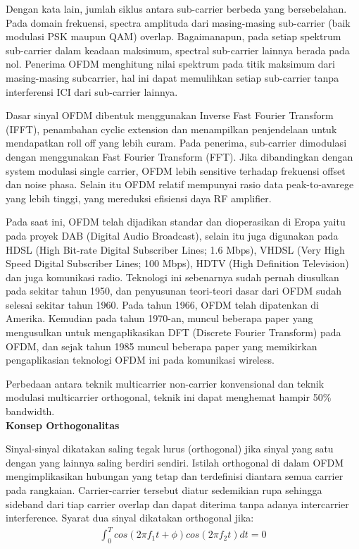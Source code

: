 \documentclass{article}
\begin{document}
Dengan kata lain, jumlah siklus antara sub-carrier berbeda yang bersebelahan. Pada domain frekuensi, spectra amplituda dari masing-masing sub-carrier (baik modulasi PSK maupun QAM) overlap. Bagaimanapun, pada setiap spektrum sub-carrier dalam keadaan maksimum, spectral sub-carrier lainnya berada pada nol. Penerima OFDM menghitung nilai spektrum pada titik maksimum dari masing-masing subcarrier, hal ini dapat memulihkan setiap sub-carrier tanpa interferensi ICI dari sub-carrier lainnya.

Dasar sinyal OFDM dibentuk menggunakan Inverse Fast Fourier Transform (IFFT), penambahan cyclic extension dan menampilkan penjendelaan untuk mendapatkan roll off yang lebih curam. Pada penerima, sub-carrier dimodulasi dengan menggunakan Fast Fourier Transform (FFT). Jika dibandingkan dengan system modulasi single carrier, OFDM lebih sensitive terhadap frekuensi offset dan noise phasa. Selain itu OFDM relatif mempunyai rasio data peak-to-avarege yang lebih tinggi, yang mereduksi efisiensi daya RF amplifier.

Pada saat ini, OFDM telah dijadikan standar dan dioperasikan di Eropa yaitu pada proyek DAB (Digital Audio Broadcast), selain itu juga digunakan pada HDSL (High Bit-rate Digital Subscriber Lines; 1.6 Mbps), VHDSL (Very High
Speed Digital Subscriber Lines; 100 Mbps), HDTV (High Definition Television) dan juga komunikasi radio. Teknologi ini sebenarnya sudah pernah diusulkan pada sekitar tahun 1950, dan penyusunan teori-teori dasar dari OFDM sudah
selesai sekitar tahun 1960. Pada tahun 1966, OFDM telah dipatenkan di Amerika. Kemudian pada tahun 1970-an, muncul beberapa paper yang mengusulkan untuk mengaplikasikan DFT (Discrete Fourier Transform) pada OFDM, dan sejak tahun 1985 muncul beberapa paper yang memikirkan pengaplikasian teknologi OFDM ini pada komunikasi wireless.

Perbedaan antara teknik multicarrier non-carrier konvensional dan teknik modulasi multicarrier orthogonal, teknik ini dapat menghemat hampir 50\% bandwidth.\\

\textbf{Konsep Orthogonalitas}

Sinyal-sinyal dikatakan saling tegak lurus (orthogonal) jika sinyal yang satu dengan yang lainnya saling berdiri sendiri. Istilah orthogonal di dalam OFDM mengimplikasikan hubungan yang tetap dan terdefinisi diantara semua
carrier pada rangkaian. Carrier-carrier tersebut diatur sedemikian rupa sehingga sideband dari tiap carrier overlap dan dapat diterima tanpa adanya intercarrier interference. Syarat dua sinyal dikatakan orthogonal jika:
\begin{align}
    \int_{0}^{T}cos(2\pi f_{1}t+\phi )cos(2\pi f_{2}t)dt=0
    \nonumber
\end{align}
\end{document}
